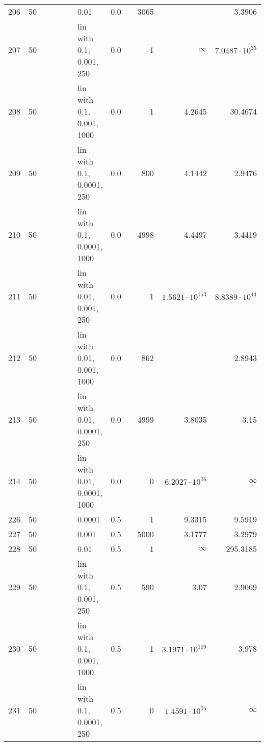 \begin{longtable}{lrrrrrlrrrrr}
  206 &      50 &   &   &   &   &                        0.01 &      0.0 &        &    3065 &                        &                 3.3906 \\
  207 &      50 &   &   &   &   &    lin with 0.1, 0.001, 250 &      0.0 &        &       1 &               $\infty$ &  $7.0487\cdot 10^{35}$ \\
  208 &      50 &   &   &   &   &   lin with 0.1, 0.001, 1000 &      0.0 &        &       1 &                 4.2645 &                30.4674 \\
  209 &      50 &   &   &   &   &   lin with 0.1, 0.0001, 250 &      0.0 &        &     800 &                 4.1442 &                 2.9476 \\
  210 &      50 &   &   &   &   &  lin with 0.1, 0.0001, 1000 &      0.0 &        &    4998 &                 4.4497 &                 3.4419 \\
  211 &      50 &   &   &   &   &   lin with 0.01, 0.001, 250 &      0.0 &        &       1 & $1.5621\cdot 10^{153}$ &  $8.8389\cdot 10^{44}$ \\
  212 &      50 &   &   &   &   &  lin with 0.01, 0.001, 1000 &      0.0 &        &     862 &                        &                 2.8943 \\
  213 &      50 &   &   &   &   &  lin with 0.01, 0.0001, 250 &      0.0 &        &    4999 &                 3.8035 &                   3.15 \\
  214 &      50 &   &   &   &   & lin with 0.01, 0.0001, 1000 &      0.0 &        &       0 &  $6.2027\cdot 10^{06}$ &               $\infty$ \\
  226 &      50 &   &   &   &   &                      0.0001 &      0.5 &        &       1 &                 9.3315 &                 9.5919 \\
  227 &      50 &   &   &   &   &                       0.001 &      0.5 &        &    5000 &                 3.1777 &                 3.2979 \\
  228 &      50 &   &   &   &   &                        0.01 &      0.5 &        &       1 &               $\infty$ &               295.3185 \\
  229 &      50 &   &   &   &   &    lin with 0.1, 0.001, 250 &      0.5 &        &     590 &                   3.07 &                 2.9069 \\
  230 &      50 &   &   &   &   &   lin with 0.1, 0.001, 1000 &      0.5 &        &       1 & $3.1971\cdot 10^{109}$ &                  3.978 \\
  231 &      50 &   &   &   &   &   lin with 0.1, 0.0001, 250 &      0.5 &        &       0 &  $1.4591\cdot 10^{05}$ &               $\infty$ \\

\end{longtable}
